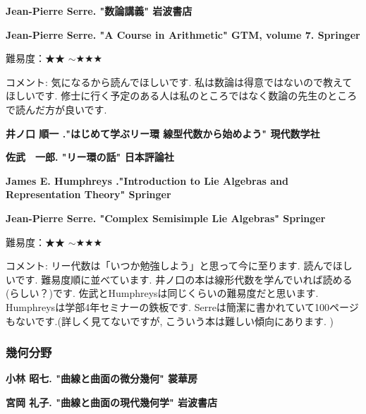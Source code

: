 \textbf{Jean-Pierre Serre. "数論講義" 岩波書店}  　\vspace{-6pt} 

\textbf{Jean-Pierre Serre. "A Course in Arithmetic" GTM, volume 7. Springer}  　\vspace{-6pt} 

難易度：★★ $\sim$★★★\vspace{-6pt} 

コメント: 気になるから読んでほしいです. 私は数論は得意ではないので教えてほしいです. 
修士に行く予定のある人は私のところではなく数論の先生のところで読んだ方が良いです. 
\vspace{8pt}

\textbf{井ノ口 順一 ."はじめて学ぶリー環 線型代数から始めよう" 現代数学社} \vspace{-6pt} 

\textbf{佐武　一郎. "リー環の話" 日本評論社} \vspace{-6pt} 

\textbf{James E. Humphreys ."Introduction to Lie Algebras and Representation Theory" Springer} \vspace{-6pt} 

\textbf{Jean-Pierre Serre. "Complex Semisimple Lie Algebras" Springer}  　\vspace{-6pt} 

難易度：★★ $\sim$★★★\vspace{-6pt} 

コメント: リー代数は「いつか勉強しよう」と思って今に至ります. 読んでほしいです. 
難易度順に並べています. 井ノ口の本は線形代数を学んでいれば読める(らしい？)です. 佐武とHumphreysは同じくらいの難易度だと思います. Humphreysは学部4年セミナーの鉄板です. Serreは簡潔に書かれていて100ページもないです.(詳しく見てないですが, こういう本は難しい傾向にあります. ) 
\vspace{8pt}





\subsubsection{幾何分野}


\textbf{小林 昭七. "曲線と曲面の微分幾何" 裳華房}  　\vspace{-6pt} 

\textbf{宮岡 礼子. "曲線と曲面の現代幾何学" 岩波書店}  　\vspace{-6pt} 

